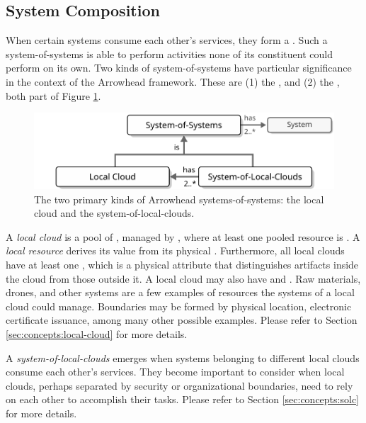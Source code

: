 \subsection{System Composition}

When certain systems consume each other's services, they form a .
Such a system-of-systems is able to perform activities none of its constituent  could perform on its own.
Two kinds of system-of-systems have particular significance in the context of the Arrowhead framework.
These are (1) the , and (2) the , both part of Figure \ref{fig:system-of-systems}.

\begin{figure}[ht!]
  \centering
  \includegraphics[scale=0.9]{figures/system-of-systems}
  \caption{
    The two primary kinds of Arrowhead systems-of-systems: the local cloud and the system-of-local-clouds.
  }
  \label{fig:system-of-systems}
\end{figure}

A \textit{local cloud} is a pool of , managed by , where at least one pooled resource is .
A \textit{local resource} derives its value from its physical .
Furthermore, all local clouds have at least one , which is a physical attribute that distinguishes artifacts inside the cloud from those outside it.
A local cloud may also have  and .
Raw materials, drones, and other systems are a few examples of resources the systems of a local cloud could manage.
Boundaries may be formed by physical location, electronic certificate issuance, among many other possible examples.
Please refer to Section \ref{sec:concepts:local-cloud} for more details.

A \textit{system-of-local-clouds} emerges when systems belonging to different local clouds consume each other's services.
They become important to consider when local clouds, perhaps separated by security or organizational boundaries, need to rely on each other to accomplish their tasks.
Please refer to Section \ref{sec:concepts:solc} for more details.
